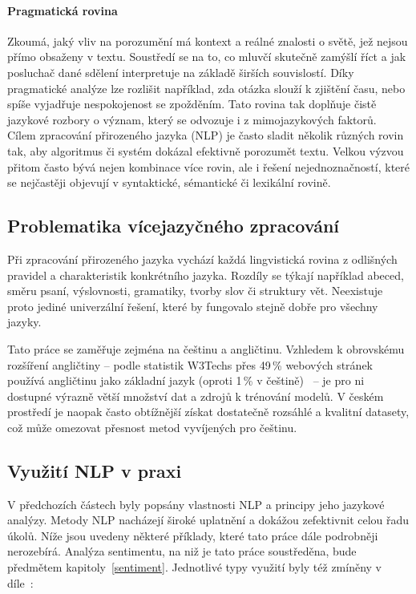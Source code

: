 \paragraph{Pragmatická rovina}
Zkoumá, jaký vliv na porozumění má kontext a reálné znalosti o světě, jež nejsou přímo obsaženy v textu. Soustředí se na to, co mluvčí skutečně zamýšlí říct a jak posluchač dané sdělení interpretuje na základě širších souvislostí. Díky pragmatické analýze lze rozlišit například, zda otázka  slouží k zjištění času, nebo spíše vyjadřuje nespokojenost se zpožděním. Tato rovina tak doplňuje čistě jazykové rozbory o význam, který se odvozuje i z mimojazykových faktorů.~\cite{Khurana2023}\\[0.3em]

Cílem zpracování přirozeného jazyka (NLP) je často sladit několik různých rovin tak, aby algoritmus či systém dokázal efektivně porozumět textu. Velkou výzvou přitom často bývá nejen kombinace více rovin, ale i řešení nejednoznačností, které se nejčastěji objevují v syntaktické, sémantické či lexikální rovině.~\cite{Khurana2023}

\subsection{Problematika vícejazyčného zpracování}\label{NLPjazyky}

Při zpracování přirozeného jazyka vychází každá lingvistická rovina z odlišných pravidel a charakteristik konkrétního jazyka. Rozdíly se týkají například abeced, směru psaní, výslovnosti, gramatiky, tvorby slov či struktury vět. Neexistuje proto jediné univerzální řešení, které by fungovalo stejně dobře pro všechny jazyky.

Tato práce se zaměřuje zejména na češtinu a angličtinu. Vzhledem k obrovskému rozšíření angličtiny -- podle statistik W3Techs přes 49\,\% webových stránek používá angličtinu jako základní jazyk (oproti 1\,\% v češtině)~\cite{w3techs-stats} -- je pro ni dostupné výrazně větší množství dat a zdrojů k trénování modelů. V českém prostředí je naopak často obtížnější získat dostatečně rozsáhlé a kvalitní datasety, což může omezovat přesnost metod vyvíjených pro češtinu.

\subsection{Využití NLP v praxi}

V předchozích částech byly popsány vlastnosti NLP a principy jeho jazykové analýzy. Metody NLP nacházejí široké uplatnění a dokážou zefektivnit celou řadu úkolů. Níže jsou uvedeny některé příklady, které tato práce dále podrobněji nerozebírá. Analýza sentimentu, na niž je tato práce soustředěna, bude předmětem kapitoly~\ref{sentiment}. Jednotlivé typy využití byly též zmíněny v díle~\cite{Khurana2023}:

